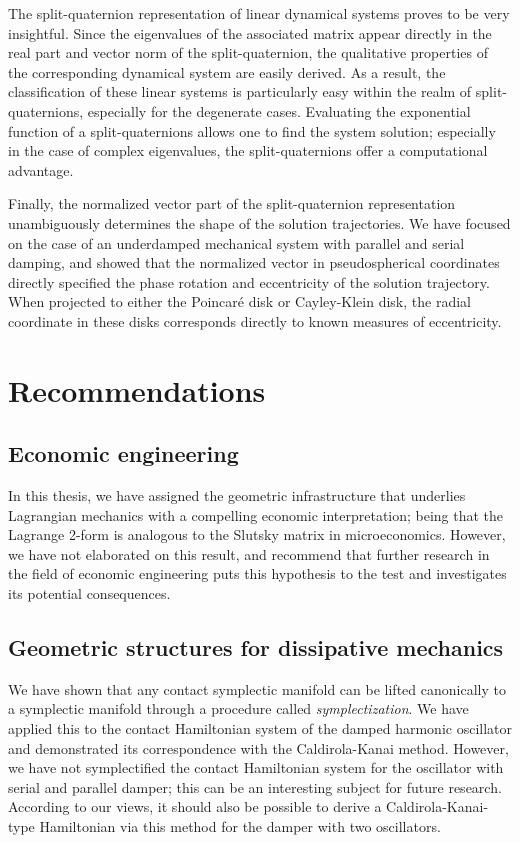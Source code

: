 The split-quaternion representation of linear dynamical systems proves to be very insightful. Since the eigenvalues of the associated matrix appear directly in the real part and vector norm of the split-quaternion, the qualitative properties of the corresponding dynamical system are easily derived. As a result, the classification of these linear systems is particularly easy within the realm of split-quaternions, especially for the degenerate cases. Evaluating the exponential function of a split-quaternions allows one to find the system solution; especially in the case of complex eigenvalues, the split-quaternions offer a computational advantage.

Finally, the normalized vector part of the split-quaternion representation unambiguously determines the shape of the solution trajectories. We have focused on the case of an underdamped mechanical system with parallel and serial damping, and showed that the normalized vector in pseudospherical coordinates directly specified the phase rotation and eccentricity of the solution trajectory. When projected to either the Poincaré disk or Cayley-Klein disk, the radial coordinate in these disks corresponds directly to known measures of eccentricity.

\section*{Recommendations}

\subsection*{Economic engineering}
In this thesis, we have assigned the geometric infrastructure that underlies Lagrangian mechanics with a compelling economic interpretation; being that the Lagrange 2-form is analogous to the Slutsky matrix in microeconomics. However, we have not elaborated on this result, and recommend that further research in the field of economic engineering puts this hypothesis to the test and investigates its potential consequences.

\subsection*{Geometric structures for dissipative mechanics}
We have shown that any contact symplectic manifold can be lifted canonically to a symplectic manifold through a procedure called \emph{symplectization}. We have applied this to the contact Hamiltonian system of the damped harmonic oscillator and demonstrated its correspondence with the Caldirola-Kanai method. However, we have not symplectified the contact Hamiltonian system for the oscillator with serial and parallel damper; this can be an interesting subject for future research. According to our views, it should also be possible to derive a Caldirola-Kanai-type Hamiltonian via this method for the damper with two oscillators.

